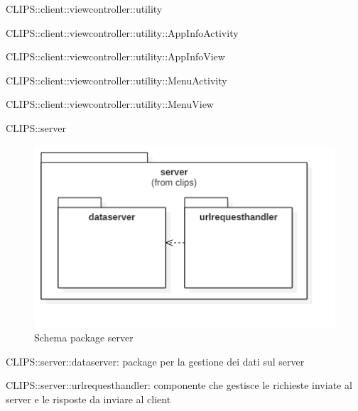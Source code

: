\begin{componente}{CLIPS::client::viewcontroller::utility}
\begin{compClassi}
\begin{classe}{CLIPS::client::viewcontroller::utility::AppInfoActivity}
\end{classe}\begin{classe}{CLIPS::client::viewcontroller::utility::AppInfoView}
\end{classe}\begin{classe}{CLIPS::client::viewcontroller::utility::MenuActivity}

\begin{classeRelazioni}
\end{classeRelazioni}
\end{classe}\begin{classe}{CLIPS::client::viewcontroller::utility::MenuView}
\end{classe}\end{compClassi}
\end{componente}
\begin{componente}{CLIPS::server}
\begin{figure}[h!] 
\centering 
\includegraphics[scale=0.4]{img/package/png/server.png} 
\caption{Schema package server} 
 \end{figure} 
\begin{compPackageContenuti}
\item CLIPS::server::dataserver: package per la gestione dei dati sul server
\item CLIPS::server::urlrequesthandler: componente che gestisce le richieste inviate al server e le risposte da inviare al client
\end{compPackageContenuti}
\end{componente}
